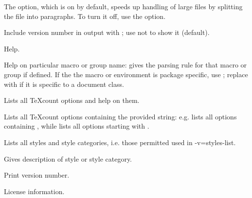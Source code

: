 \begin{description}
The  option, which is on by default, speeds up handling of large files by splitting the file into paragraphs. To turn it off, use the  option.

Include version number in output with ; use  not to show it (default). 

\option[-h, -?, --help, /?]Help.

\option[-h=, -?=, --help=, /?=]Help on particular macro or group name: gives the parsing rule for that macro or group if defined. If the the macro or environment is package specific, use ; replace  with  if it is specific to a document class.

Lists all TeXcount options and help on them.

\option[--help-option=, -h-opt=]Lists all TeXcount options containing the provided string: e.g.  lists all options containing , while  lists all options starting with .

Lists all styles and style categories, i.e. those permitted used in -v={styles-list}.

\option[-help-style=, -h-style=]Gives description of style or style category. 

Print version number.

License information.

\end{description}
